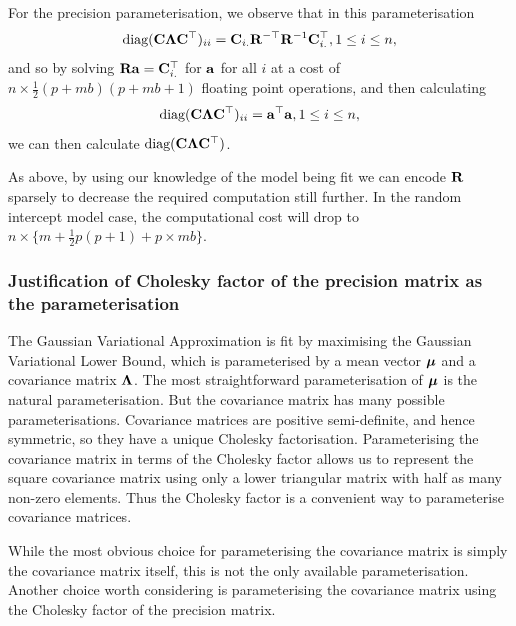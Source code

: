 	
For the precision parameterisation, we observe that in this parameterisation
\begin{equation*}
	\text{diag}({\bf C} {\boldsymbol \Lambda} {\bf C}^\top)_{ii} = {\bf C}_{i .} {\bf R}^{-\top} {\bf R}^{-1} {\bf C}_{i .}^\top, 1 \leq i \leq n,
\end{equation*}
\noindent and so by solving ${\bf R} {\bf a} = {\bf C}_{i .}^\top$ for ${\bf a}$ for all $i$ at a cost of $n \times
\frac{1}{2} (p + m b) (p + m b + 1)$ floating point operations, and then calculating
\begin{equation*}
	\text{diag}({\bf C} {\boldsymbol \Lambda} {\bf C}^\top)_{ii} = {\bf a}^\top {\bf a}, 1 \leq i \leq n,
\end{equation*}
\noindent we can then calculate $\text{diag}({\bf C} {\boldsymbol \Lambda} {\bf C}^\top)$.
	
As above, by using our knowledge of the model being fit we can encode ${\bf R}$ sparsely to decrease the required
computation still further. In the random intercept model case, the computational cost will drop to $n \times
\{m + \frac{1}{2} p (p + 1) + p \times m b\}$.
			
\subsubsection{Justification of Cholesky factor of the precision matrix as the parameterisation}
The Gaussian Variational Approximation is fit by maximising the Gaussian Variational Lower Bound, which is
parameterised by a mean vector ${\boldsymbol \mu}$ and a covariance matrix ${\boldsymbol \Lambda}$. The most straightforward
parameterisation of ${\boldsymbol \mu}$ is the natural parameterisation. But the covariance matrix has many possible
parameterisations. Covariance matrices are positive semi-definite, and hence symmetric, so they have a unique
Cholesky factorisation. Parameterising the covariance matrix in terms of the Cholesky factor allows us to
represent the square covariance matrix using only a lower triangular matrix with half as many non-zero
elements. Thus the Cholesky factor is a convenient way to parameterise covariance matrices.

While the most obvious choice for parameterising the covariance matrix is simply the covariance matrix itself,
this is not the only available parameterisation. Another choice worth considering is parameterising the
covariance matrix using the Cholesky factor of the precision matrix.


